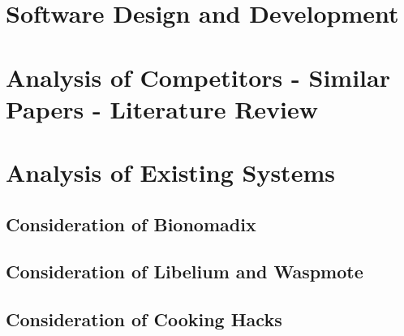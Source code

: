 \section{Software Design and Development}
\label{software}




\section{Analysis of Competitors - Similar Papers - Literature Review}







\section{Analysis of Existing Systems}

\subsection{Consideration of Bionomadix}

\subsection{Consideration of Libelium and Waspmote}

\subsection{Consideration of Cooking Hacks}
